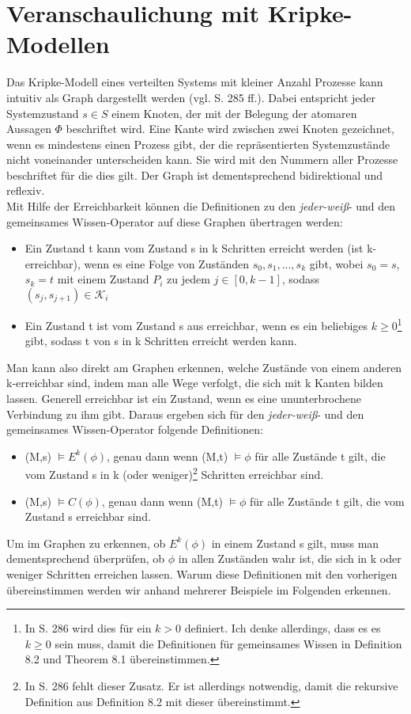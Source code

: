 \section{Veranschaulichung mit Kripke-Modellen}
\label{Kripke-Modelle}
Das Kripke-Modell eines verteilten Systems mit kleiner Anzahl Prozesse kann intuitiv als Graph dargestellt werden (vgl. \cite{kshemkalyani2011distributed} S. 285 ff.). Dabei entspricht jeder Systemzustand $s\in S$ einem Knoten, der mit der Belegung der atomaren Aussagen $\Phi$ beschriftet wird. Eine Kante wird zwischen zwei Knoten gezeichnet, wenn es mindestens einen Prozess gibt, der die repräsentierten Systemzustände nicht voneinander unterscheiden kann. Sie wird mit den Nummern aller Prozesse beschriftet für die dies gilt.
Der Graph ist dementsprechend bidirektional und reflexiv.\\
Mit Hilfe der Erreichbarkeit können die Definitionen zu den \textit{jeder-weiß}- und den gemeinsames Wissen-Operator auf diese Graphen übertragen werden:
\begin{itemize}
	\item Ein Zustand t kann vom Zustand s in k Schritten erreicht werden (ist k-erreichbar), wenn es eine Folge von Zuständen $s_0,s_1,...,s_k$ gibt, wobei $s_0 = s$, $s_k = t$ mit einem Zustand $P_i$ zu jedem $j\in [ 0,k-1 ]$, sodass $(s_j,s_{j+1})\in \mathcal{K}_i$
	\item Ein Zustand t ist vom Zustand s aus erreichbar, wenn es ein beliebiges $k \ge 0$\footnote{In \cite{kshemkalyani2011distributed} S. 286 wird dies für ein $k > 0$ definiert. Ich denke allerdings, dass es es $k \ge 0$ sein muss, damit die Definitionen für gemeinsames Wissen in Definition 8.2 und Theorem 8.1 übereinstimmen. } gibt, sodass t von s in k Schritten erreicht werden kann.
\end{itemize}
Man kann also direkt am Graphen erkennen, welche Zustände von einem anderen k-erreichbar sind, indem man alle Wege verfolgt, die sich mit k Kanten bilden lassen.
Generell erreichbar ist ein Zustand, wenn es eine ununterbrochene Verbindung zu ihm gibt.
Daraus ergeben sich für den \textit{jeder-weiß}- und den gemeinsames Wissen-Operator folgende Definitionen:
\begin{itemize}
	\item (M,s) $\vDash E^{k}(\phi)$, genau dann wenn (M,t) $\vDash \phi$ für alle Zustände t gilt, die vom Zustand s in k (oder weniger)\footnote{In \cite{kshemkalyani2011distributed} S. 286 fehlt dieser Zusatz. Er ist allerdings notwendig, damit die rekursive Definition aus Definition 8.2 mit dieser übereinstimmt.} Schritten erreichbar sind.
	\item (M,s) $\vDash C(\phi)$, genau dann wenn (M,t) $\vDash \phi$ für alle Zustände t gilt, die vom Zustand s erreichbar sind.
\end{itemize}
Um im Graphen zu erkennen, ob $E^{k}(\phi)$ in einem Zustand s gilt, muss man dementsprechend überprüfen, ob $\phi$ in allen Zuständen wahr ist, die sich in k oder weniger Schritten erreichen lassen. 
Warum diese Definitionen mit den vorherigen übereinstimmen werden wir anhand mehrerer Beispiele im Folgenden erkennen.

